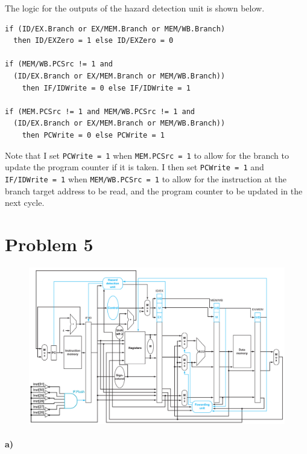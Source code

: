 \documentclass[12pt]{article}
\begin{document}
The logic for the outputs of the hazard detection unit is shown below.
\begin{verbatim}
if (ID/EX.Branch or EX/MEM.Branch or MEM/WB.Branch)
  then ID/EXZero = 1 else ID/EXZero = 0

if (MEM/WB.PCSrc != 1 and
  (ID/EX.Branch or EX/MEM.Branch or MEM/WB.Branch))
    then IF/IDWrite = 0 else IF/IDWrite = 1

if (MEM.PCSrc != 1 and MEM/WB.PCSrc != 1 and
  (ID/EX.Branch or EX/MEM.Branch or MEM/WB.Branch))
    then PCWrite = 0 else PCWrite = 1
\end{verbatim}
Note that I set \texttt{PCWrite = 1} when \texttt{MEM.PCSrc = 1} to allow for the branch to update the program counter if it is taken. I then
set \texttt{PCWrite = 1} and \texttt{IF/IDWrite = 1} when \texttt{MEM/WB.PCSrc = 1} to allow for the instruction at the branch target address to be read, and the
program counter to be updated in the next cycle.

\pagebreak

\section*{Problem 5}

\begin{figure}[!ht]
        \hspace*{-4cm}
        \begin{center}
                \includegraphics[width=4.8in]{problem5a.png}
        \end{center}
        \hspace*{-4cm}
\end{figure}

\paragraph{a)}
\end{document}
